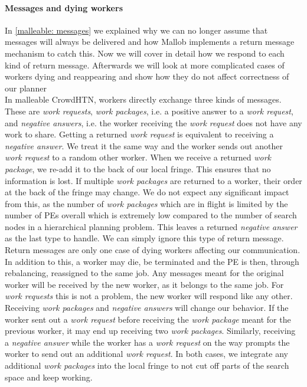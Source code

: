 \paragraph{Messages and dying workers}
\label{impl: malleable messages}
In \ref{malleable: messages} we explained why we can no longer assume that messages will always be delivered and how Mallob implements a return message mechanism to catch this. Now we will cover in detail how we respond to each kind of return message. Afterwards we will look at more complicated cases of workers dying and reappearing and show how they do not affect correctness of our planner \\
In malleable CrowdHTN, workers directly exchange three kinds of messages. These are \textit{work requests}, \textit{work packages}, i.e. a positive answer to a \textit{work request}, and \textit{negative answers}, i.e. the worker receiving the \textit{work request} does not have any work to share.
Getting a returned \textit{work request} is equivalent to receiving a \textit{negative answer}. We treat it the same way and the worker sends out another \textit{work request} to a random other worker. When we receive a returned \textit{work package}, we re-add it to the back of our local fringe. This ensures that no information is lost. If multiple \textit{work packages} are returned to a worker, their order at the back of the fringe may change. We do not expect any significant impact from this, as the number of \textit{work packages} which are in flight is limited by the number of PEs overall which is extremely low compared to the number of search nodes in a hierarchical planning problem. This leaves a returned \textit{negative answer} as the last type to handle. We can simply ignore this type of return message. \\
Return messages are only one case of dying workers affecting our communication. In addition to this, a worker may die, be terminated and the PE is then, through rebalancing, reassigned to the same job. Any messages meant for the original worker will be received by the new worker, as it belongs to the same job. For \textit{work requests} this is not a problem, the new worker will respond like any other. Receiving \textit{work packages} and \textit{negative answers} will change our behavior. If the worker sent out a \textit{work request} before receiving the \textit{work package} meant for the previous worker, it may end up receiving two \textit{work packages}. Similarly, receiving a \textit{negative answer} while the worker has a \textit{work request} on the way prompts the worker to send out an additional \textit{work request}. In both cases, we integrate any additional \textit{work packages} into the local fringe to not cut off parts of the search space and keep working. 
